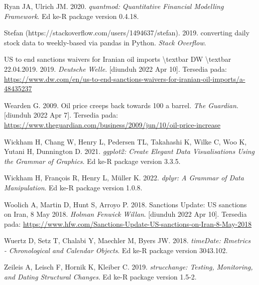 \documentclass[
]{book}
\newlength{\cslhangindent}
\newlength{\cslentryspacingunit} %
\newenvironment{CSLReferences}[2] %
 {%
  \setlength{\parindent}{0pt}
  \ifodd #1
  \let\oldpar\par
  \def\par{\hangindent=\cslhangindent\oldpar}
  \fi
  \setlength{\parskip}{#2\cslentryspacingunit}
 }%
 {}
\begin{document}
\begin{CSLReferences}{0}{0}
\leavevmode{}%
Ryan JA, Ulrich JM. 2020. \emph{quantmod: Quantitative Financial Modelling Framework}. Ed ke-R package version 0.4.18.

\leavevmode{}%
Stefan (https://stackoverflow.com/users/1494637/stefan). 2019. converting daily stock data to weekly-based via pandas in Python. \emph{Stack Overflow}.

\leavevmode{}%
{US} to end sanctions waivers for {Iranian} oil imports {\textbackslash{}}textbar {DW} {\textbackslash{}}textbar 22.04.2019. 2019. \emph{Deutsche Welle}. {[}diunduh 2022 Apr 10{]}. Tersedia pada: \url{https://www.dw.com/en/us-to-end-sanctions-waivers-for-iranian-oil-imports/a-48435237}

\leavevmode{}%
Wearden G. 2009. Oil price creeps back towards 100 a barrel. \emph{The Guardian}. {[}diunduh 2022 Apr 7{]}. Tersedia pada: \url{https://www.theguardian.com/business/2009/jun/10/oil-price-increase}

\leavevmode{}%
Wickham H, Chang W, Henry L, Pedersen TL, Takahashi K, Wilke C, Woo K, Yutani H, Dunnington D. 2021. \emph{ggplot2: Create Elegant Data Visualisations Using the Grammar of Graphics}. Ed ke-R package version 3.3.5.

\leavevmode{}%
Wickham H, François R, Henry L, Müller K. 2022. \emph{dplyr: A Grammar of Data Manipulation}. Ed ke-R package version 1.0.8.

\leavevmode{}%
Woolich A, Martin D, Hunt S, Arroyo P. 2018. Sanctions {Update}: {US} sanctions on {Iran}, 8 {May} 2018. \emph{Holman Fenwick Willan}. {[}diunduh 2022 Apr 10{]}. Tersedia pada: \url{https://www.hfw.com/Sanctions-Update-US-sanctions-on-Iran-8-May-2018}

\leavevmode{}%
Wuertz D, Setz T, Chalabi Y, Maechler M, Byers JW. 2018. \emph{timeDate: Rmetrics - Chronological and Calendar Objects}. Ed ke-R package version 3043.102.

\leavevmode{}%
Zeileis A, Leisch F, Hornik K, Kleiber C. 2019. \emph{strucchange: Testing, Monitoring, and Dating Structural Changes}. Ed ke-R package version 1.5-2.

\end{CSLReferences}
\end{document}
